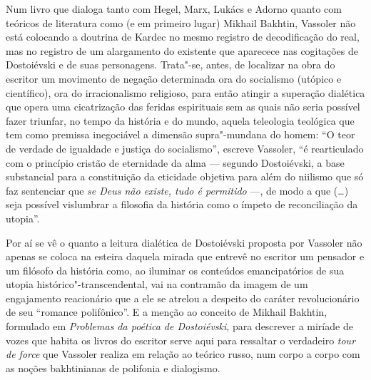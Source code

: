 Num livro que dialoga tanto com Hegel, Marx, Lukács e Adorno quanto com
teóricos de literatura como (e em primeiro lugar) Mikhail Bakhtin,
Vassoler não está colocando a doutrina de Kardec no mesmo registro de
decodificação do real, mas no registro de um alargamento do existente
que aparecece nas cogitações de Dostoiévski e de suas personagens.
Trata"-se, antes, de localizar na obra do escritor um movimento de
negação determinada ora do socialismo (utópico e científico), ora do
irracionalismo religioso, para então atingir a superação dialética que
opera uma cicatrização das feridas espirituais sem as quais não seria
possível fazer triunfar, no tempo da história e do mundo, aquela
teleologia teológica que tem como premissa inegociável a dimensão
supra"-mundana do homem: ``O teor de verdade de igualdade e justiça do
socialismo'', escreve Vassoler, ``é rearticulado com o princípio cristão
de eternidade da alma --- segundo Dostoiévski, a base substancial para a
constituição da eticidade objetiva para além do niilismo que só faz
sentenciar que \emph{se Deus não existe, tudo é permitido} ---, de modo a
que (\ldots) seja possível vislumbrar a filosofia da história como o ímpeto
de reconciliação da utopia''.

Por aí se vê o quanto a leitura dialética de Dostoiévski proposta por
Vassoler não apenas se coloca na esteira daquela mirada que entrevê no
escritor um pensador e um filósofo da história como, ao iluminar os
conteúdos emancipatórios de sua utopia histórico"-transcendental, vai na
contramão da imagem de um engajamento reacionário que a ele se atrelou a
despeito do caráter revolucionário de seu ``romance polifônico''. E a
menção ao conceito de Mikhail Bakhtin, formulado em \emph{Problemas da
poética de Dostoiévski}, para descrever a miríade de vozes que habita os
livros do escritor serve aqui para ressaltar o verdadeiro \emph{tour de
force} que Vassoler realiza em relação ao teórico russo, num corpo a
corpo com as noções bakhtinianas de polifonia e dialogismo.

